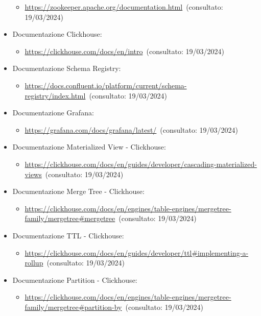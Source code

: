 \begin{itemize}
    \begin{itemize}
        \item \url{https://zookeeper.apache.org/documentation.html}~(consultato: 19/03/2024)
    \end{itemize}
    \item Documentazione Clickhouse: 
    \begin{itemize}
        \item \url{https://clickhouse.com/docs/en/intro}~(consultato: 19/03/2024)
    \end{itemize}
    \item Documentazione Schema Registry: 
    \begin{itemize}
        \item \url{https://docs.confluent.io/platform/current/schema-registry/index.html}~(consultato: 19/03/2024)
    \end{itemize}
    \item Documentazione Grafana: 
    \begin{itemize}
        \item \url{https://grafana.com/docs/grafana/latest/}~(consultato: 19/03/2024)
    \end{itemize}
    \item Documentazione Materialized View - Clickhouse: 
    \begin{itemize}
        \item \url{https://clickhouse.com/docs/en/guides/developer/cascading-materialized-views}~(consultato: 19/03/2024)
    \end{itemize}
    \item Documentazione Merge Tree - Clickhouse: 
    \begin{itemize}
        \item \url{https://clickhouse.com/docs/en/engines/table-engines/mergetree-family/mergetree#mergetree}~(consultato: 19/03/2024)
    \end{itemize}
    \item Documentazione TTL - Clickhouse: 
    \begin{itemize}
        \item \url{https://clickhouse.com/docs/en/guides/developer/ttl#implementing-a-rollup}~(consultato: 19/03/2024)
    \end{itemize}
    \item Documentazione Partition - Clickhouse: 
    \begin{itemize}
        \item \url{https://clickhouse.com/docs/en/engines/table-engines/mergetree-family/mergetree#partition-by}~(consultato: 19/03/2024)

\end{itemize}
\end{itemize}
